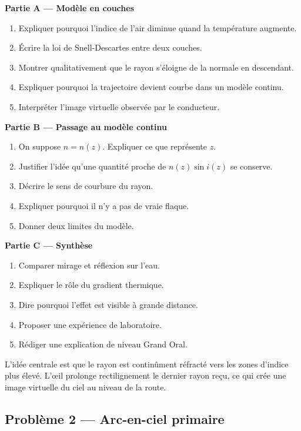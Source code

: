 \documentclass[11pt,a4paper]{article}
\begin{document}
\textbf{Partie A — Modèle en couches}
\begin{enumerate}
  \item Expliquer pourquoi l'indice de l'air diminue quand la température augmente.
  \item Écrire la loi de Snell-Descartes entre deux couches.
  \item Montrer qualitativement que le rayon s'éloigne de la normale en descendant.
  \item Expliquer pourquoi la trajectoire devient courbe dans un modèle continu.
  \item Interpréter l'image virtuelle observée par le conducteur.
\end{enumerate}

\textbf{Partie B — Passage au modèle continu}
\begin{enumerate}
  \item On suppose $n=n(z)$. Expliquer ce que représente $z$.
  \item Justifier l'idée qu'une quantité proche de $n(z)\sin i(z)$ se conserve.
  \item Décrire le sens de courbure du rayon.
  \item Expliquer pourquoi il n'y a pas de vraie flaque.
  \item Donner deux limites du modèle.
\end{enumerate}

\textbf{Partie C — Synthèse}
\begin{enumerate}
  \item Comparer mirage et réflexion sur l'eau.
  \item Expliquer le rôle du gradient thermique.
  \item Dire pourquoi l'effet est visible à grande distance.
  \item Proposer une expérience de laboratoire.
  \item Rédiger une explication de niveau Grand Oral.
\end{enumerate}

\begin{corrigebox}
L'idée centrale est que le rayon est continûment réfracté vers les zones d'indice plus élevé. L'œil prolonge rectilignement le dernier rayon reçu, ce qui crée une image virtuelle du ciel au niveau de la route.
\end{corrigebox}

\subsection{Problème 2 — Arc-en-ciel primaire}
\end{document}
